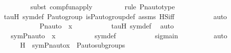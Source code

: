 \begin{isabellebody}
\ \ \ \ \ \ \ \ \isamarkupfalse%
{\isacharparenleft}{\kern0pt}subst\ comp{\isacharunderscore}{\kern0pt}fun{\isacharunderscore}{\kern0pt}apply{\isacharparenright}{\kern0pt}\isanewline
\ \ \ \ \ \ \ \ \isamarkupfalse%
{\isacharparenleft}{\kern0pt}rule\ Pn{\isacharunderscore}{\kern0pt}auto{\isacharunderscore}{\kern0pt}type{\isacharparenright}{\kern0pt}\isanewline
\ \ \ \ \ \ \ \ \isamarkupfalse%
\ tauH\ sym{\isacharunderscore}{\kern0pt}def\ {\isasymG}{\isacharunderscore}{\kern0pt}P{\isacharunderscore}{\kern0pt}auto{\isacharunderscore}{\kern0pt}group\ is{\isacharunderscore}{\kern0pt}P{\isacharunderscore}{\kern0pt}auto{\isacharunderscore}{\kern0pt}group{\isacharunderscore}{\kern0pt}def\ assms{}\ HS{\isacharunderscore}{\kern0pt}iff\ \isanewline
\ \ \ \ \ \ \ \ \isamarkupfalse%
\ auto\isanewline
\ \ \ \ \ \ \isamarkupfalse%
\ \isamarkupfalse%
\ {\isachardoublequoteopen}{\isachardot}{\kern0pt}{\isachardot}{\kern0pt}{\isachardot}{\kern0pt}\ {\isacharequal}{\kern0pt}\ Pn{\isacharunderscore}{\kern0pt}auto{\isacharparenleft}{\kern0pt}{\isasympi}{\isacharparenright}{\kern0pt}\ {\isacharbackquote}{\kern0pt}\ x{\isachardoublequoteclose}\ \isanewline
\ \ \ \ \ \ \ \ \isamarkupfalse%
\ tauH\ sym{\isacharunderscore}{\kern0pt}def\ \isamarkupfalse%
\ auto\ \isanewline
\ \ \ \ \ \ \isamarkupfalse%
\ \isamarkupfalse%
\ {\isachardoublequoteopen}{\isasymsigma}\ {\isasymin}\ sym{\isacharparenleft}{\kern0pt}Pn{\isacharunderscore}{\kern0pt}auto{\isacharparenleft}{\kern0pt}{\isasympi}{\isacharparenright}{\kern0pt}\ {\isacharbackquote}{\kern0pt}\ x{\isacharparenright}{\kern0pt}{\isachardoublequoteclose}\ \isanewline
\ \ \ \ \ \ \ \ \isamarkupfalse%
\ sym{\isacharunderscore}{\kern0pt}def\ \isanewline
\ \ \ \ \ \ \ \ \isamarkupfalse%
\ sigmain\isanewline
\ \ \ \ \ \ \ \ \isamarkupfalse%
\ auto\ \isanewline
\ \ \ \ \isamarkupfalse%
\isanewline
\isanewline
\ \ \ \ \isamarkupfalse%
\ H{}\ {\isacharcolon}{\kern0pt}\ {\isachardoublequoteopen}sym{\isacharparenleft}{\kern0pt}Pn{\isacharunderscore}{\kern0pt}auto{\isacharparenleft}{\kern0pt}{\isasympi}{\isacharparenright}{\kern0pt}{\isacharbackquote}{\kern0pt}x{\isacharparenright}{\kern0pt}\ {\isasymin}\ P{\isacharunderscore}{\kern0pt}auto{\isacharunderscore}{\kern0pt}subgroups{\isacharparenleft}{\kern0pt}{\isasymG}{\isacharparenright}{\kern0pt}{\isachardoublequoteclose}\ \isanewline

\end{isabellebody}
